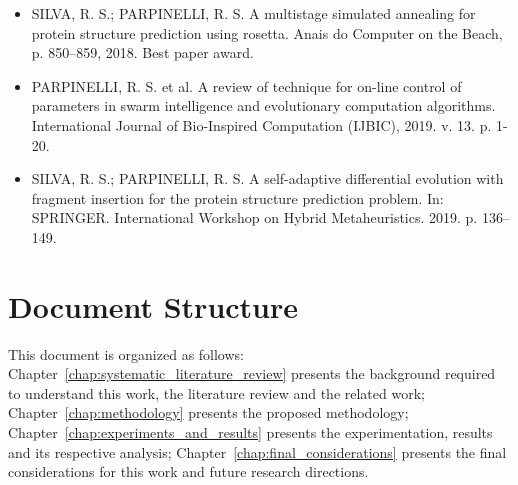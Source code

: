 \begin{itemize}
    \item SILVA, R. S.; PARPINELLI, R. S. A multistage simulated annealing for protein structure prediction using rosetta. Anais do Computer on the Beach, p. 850–859, 2018. Best paper award.
    \item PARPINELLI, R. S. et al. A review of technique for on-line control of parameters in swarm intelligence and evolutionary computation algorithms. International Journal of Bio-Inspired Computation (IJBIC), 2019. v. 13. p. 1-20.
    \item SILVA, R. S.; PARPINELLI, R. S. A self-adaptive differential evolution with fragment insertion  for  the  protein  structure  prediction  problem.  In:  SPRINGER. International Workshop on Hybrid Metaheuristics. 2019. p. 136–149.
\end{itemize}

\section{Document Structure} \label{sec:chap1_document_structure}

This document is organized as follows:
Chapter~\ref{chap:systematic_literature_review} presents the background
required to understand this work, the literature review and the related work;
Chapter~\ref{chap:methodology} presents the proposed methodology;
Chapter~\ref{chap:experiments_and_results} presents the experimentation,
results and its respective analysis;
Chapter~\ref{chap:final_considerations} presents the final considerations for
this work and future research directions.


